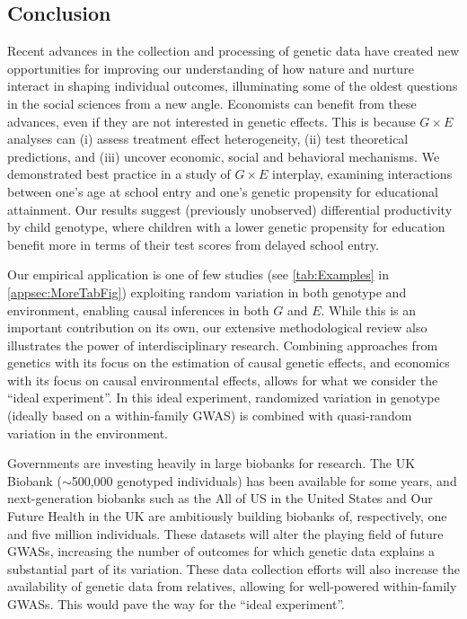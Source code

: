 \documentclass[12pt,a4paper]{article}
\begin{document}
\begin{bibunit}
\section{Conclusion} \label{sec:discussion}
Recent advances in the collection and processing of genetic data have created new opportunities for improving our understanding of how nature and nurture interact in shaping individual outcomes, illuminating some of the oldest questions in the social sciences from a new angle. 
Economists can benefit from these advances, even if they are not interested in genetic effects. This is because $G \times E$ analyses can (i) assess treatment effect heterogeneity, (ii) test theoretical predictions, and (iii) uncover economic, social and behavioral mechanisms. We demonstrated best practice in a study of $G \times E$ interplay, examining interactions between one's age at school entry and one's genetic propensity for educational attainment. Our results suggest (previously unobserved) differential productivity by child genotype, where children with a lower genetic propensity for education benefit more in terms of their test scores from delayed school entry. 

Our empirical application is one of few studies (see \autoref{tab:Examples} in \autoref{appsec:MoreTabFig}) exploiting random variation in both genotype and environment, enabling causal inferences in both $G$ and $E$. While this is an important contribution on its own, our extensive methodological review also illustrates the power of interdisciplinary research. Combining approaches from genetics with its focus on the estimation of causal genetic effects, and economics with its focus on causal environmental effects, allows for what we consider the ``ideal experiment''. In this ideal experiment, randomized variation in genotype (ideally based on a within-family GWAS) is combined with quasi-random variation in the environment.

Governments are investing heavily in large biobanks for research. The UK Biobank (${\sim}$500,000 genotyped individuals) has been available for some years, and next-generation biobanks such as the All of US in the United States and Our Future Health in the UK are ambitiously building biobanks of, respectively, one and five million individuals. These datasets will alter the playing field of future GWASs, increasing the number of outcomes for which genetic data explains a substantial part of its variation. These data collection efforts will also increase the availability of genetic data from relatives, allowing for well-powered within-family GWASs. This would pave the way for the ``ideal experiment''. 


\end{bibunit}
\end{document}

